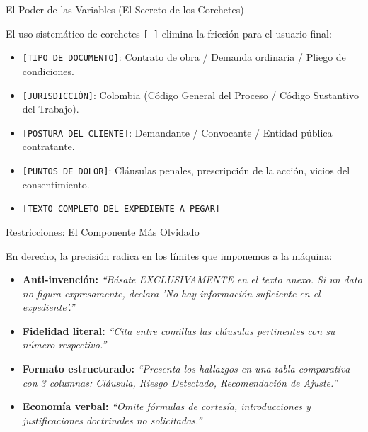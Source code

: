 \documentclass[aspectratio=169]{beamer}
\begin{document}
\begin{frame}{El Poder de las Variables (El Secreto de los Corchetes)}

El uso sistemático de corchetes \texttt{[ ]} elimina la fricción para el usuario final:
\begin{itemize}
  \item \texttt{[TIPO DE DOCUMENTO]}: Contrato de obra / Demanda ordinaria / Pliego de condiciones.
  \item \texttt{[JURISDICCIÓN]}: Colombia (Código General del Proceso / Código Sustantivo del Trabajo).
  \item \texttt{[POSTURA DEL CLIENTE]}: Demandante / Convocante / Entidad pública contratante.
  \item \texttt{[PUNTOS DE DOLOR]}: Cláusulas penales, prescripción de la acción, vicios del consentimiento.
  \item \texttt{[TEXTO COMPLETO DEL EXPEDIENTE A PEGAR]}
\end{itemize}
\end{frame}

\begin{frame}{Restricciones: El Componente Más Olvidado}

En derecho, la precisión radica en los límites que imponemos a la máquina:
\begin{itemize}
  \item \textbf{Anti-invención:} \textit{``Básate EXCLUSIVAMENTE en el texto anexo. Si un dato no figura expresamente, declara 'No hay información suficiente en el expediente'.''}
  \item \textbf{Fidelidad literal:} \textit{``Cita entre comillas las cláusulas pertinentes con su número respectivo.''}
  \item \textbf{Formato estructurado:} \textit{``Presenta los hallazgos en una tabla comparativa con 3 columnas: Cláusula, Riesgo Detectado, Recomendación de Ajuste.''}
  \item \textbf{Economía verbal:} \textit{``Omite fórmulas de cortesía, introducciones y justificaciones doctrinales no solicitadas.''}
\end{itemize}
\end{frame}
\end{document}
